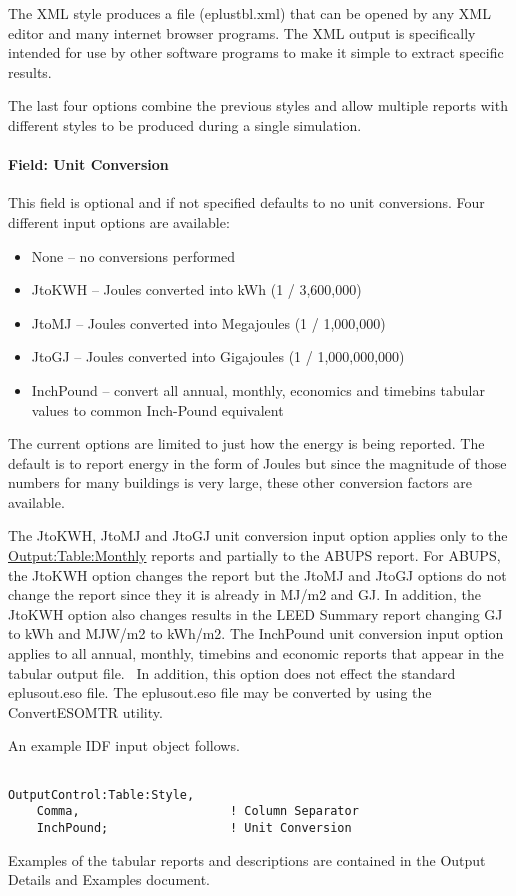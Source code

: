 The XML style produces a file (eplustbl.xml) that can be opened by any XML editor and many internet browser programs. The XML output is specifically intended for use by other software programs to make it simple to extract specific results.

The last four options combine the previous styles and allow multiple reports with different styles to be produced during a single simulation.

\paragraph{Field: Unit Conversion}\label{field-unit-conversion}

This field is optional and if not specified defaults to no unit conversions. Four different input options are available:

\begin{itemize}
\item
  None -- no conversions performed
\item
  JtoKWH -- Joules converted into kWh (1 / 3,600,000)
\item
  JtoMJ -- Joules converted into Megajoules (1 / 1,000,000)
\item
  JtoGJ -- Joules converted into Gigajoules (1 / 1,000,000,000)
\item
  InchPound -- convert all annual, monthly, economics and timebins tabular values to common Inch-Pound equivalent
\end{itemize}

The current options are limited to just how the energy is being reported. The default is to report energy in the form of Joules but since the magnitude of those numbers for many buildings is very large, these other conversion factors are available.

The JtoKWH, JtoMJ and JtoGJ unit conversion input option applies only to the \hyperref[outputtablemonthly]{Output:Table:Monthly} reports and partially to the ABUPS report. For ABUPS, the JtoKWH option changes the report but the JtoMJ and JtoGJ options do not change the report since they it is already in MJ/m2 and GJ. In addition, the JtoKWH option also changes results in the LEED Summary report changing GJ to kWh and MJW/m2 to kWh/m2. The InchPound unit conversion input option applies to all annual, monthly, timebins and economic reports that appear in the tabular output file.~ In addition, this option does not effect the standard eplusout.eso file. The eplusout.eso file may be converted by using the ConvertESOMTR utility.

An example IDF input object follows.

\begin{lstlisting}

OutputControl:Table:Style,
    Comma,                     ! Column Separator
    InchPound;                 ! Unit Conversion
\end{lstlisting}

Examples of the tabular reports and descriptions are contained in the Output Details and Examples document.
